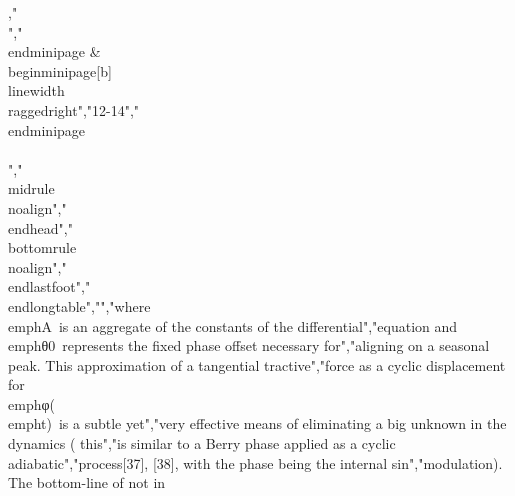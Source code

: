 {{{{{{{{{{,"\\[\\begin{array}{r}","\\zeta(t) = \\sin(\\sqrt{A}\\sum_{i = 1}^{i = N}{k_{i}\\sin(\\omega_{i}t) + \\theta_{0})}","\\end{array}\\]","\\end{minipage} & \\begin{minipage}[b]{\\linewidth}\\raggedright","12-14","\\end{minipage} \\\\","\\midrule\\noalign{}","\\endhead","\\bottomrule\\noalign{}","\\endlastfoot","\\end{longtable}","","where \\emph{A}~is an aggregate of the constants of the differential","equation and \\emph{θ}0~represents the fixed phase offset necessary for","aligning on a seasonal peak. This approximation of a tangential tractive","force as a cyclic displacement for \\emph{φ}(\\emph{t})~is a subtle yet","very effective means of eliminating a big unknown in the dynamics ( this","is similar to a Berry phase applied as a cyclic adiabatic","process{[}37{]}, {[}38{]}, with the phase being the internal sin","modulation). The bottom-line of not in}}}}}}}}}}
